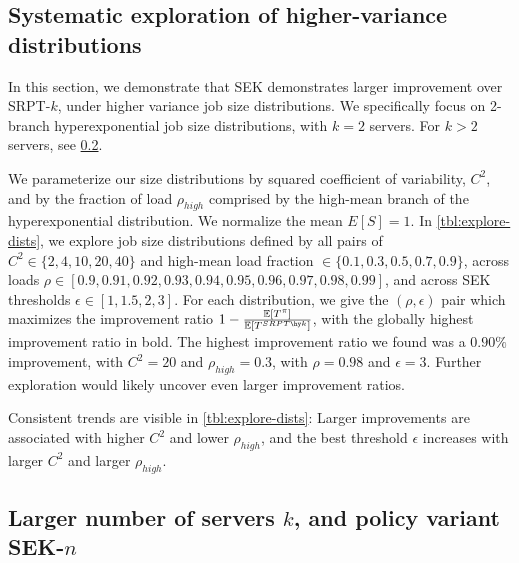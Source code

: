 \documentclass[acmsmall]{acmart}
\newcommand{\E}[1]{\mathbb{E}[#1]}
\begin{document}
\subsection{Systematic exploration of higher-variance distributions}
\label{sec:empirical-explore-dists}

In this section, we demonstrate that SEK demonstrates larger improvement over SRPT-$k$, under higher variance job size distributions.
We specifically focus on 2-branch hyperexponential job size distributions, with $k=2$ servers. For $k>2$ servers, see \cref{sec:empirical-more-servers}.

We parameterize our size distributions by squared coefficient of variability, $C^2$, and by the fraction of load $\rho_{high}$ comprised by the high-mean branch of the hyperexponential distribution. We normalize the mean $E[S]=1$.
In \cref{tbl:explore-dists}, we explore job size distributions defined by all pairs of $C^2 \in \{2, 4, 10, 20, 40\}$
and high-mean load fraction $\in \{0.1, 0.3, 0.5, 0.7, 0.9\}$,
across loads $\rho \in [0.9, 0.91, 0.92, 0.93, 0.94, 0.95, 0.96, 0.97, 0.98, 0.99]$,
and across SEK thresholds $\epsilon \in [1, 1.5, 2, 3]$.
For each distribution, we give the $(\rho, \epsilon)$ pair which maximizes the improvement ratio $1 - \frac{\E{T^\pi}}{\E{T^{SRPT\hy k}}}$,
with the globally highest improvement ratio in bold.
The highest improvement ratio we found was a $0.90\%$ improvement, with $C^2=20$ and $\rho_{high}=0.3$, with $\rho=0.98$ and $\epsilon=3$.
Further exploration would likely uncover even larger improvement ratios.

Consistent trends are visible in \cref{tbl:explore-dists}:
Larger improvements are associated with higher $C^2$ and lower $\rho_{high}$, and the best threshold $\epsilon$ increases with larger $C^2$ and larger $\rho_{high}$.


\subsection{Larger number of servers $k$, and policy variant SEK-$n$}
\label{sec:empirical-more-servers}
\end{document}
